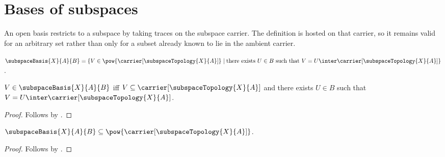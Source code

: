 \section{Bases of subspaces}




An open basis restricts to a subspace by taking traces on the subspace
carrier.  The definition is hosted on that carrier, so it remains valid for
an arbitrary set rather than only for a subset already known to lie in the
ambient carrier.

\begin{definition}\label{subspace_basis}
    $\subspaceBasis{X}{A}{B}
        =\{V\in\pow{\carrier[\subspaceTopology{X}{A}]}\mid
            \text{there exists $U\in B$ such that
                $V=U\inter\carrier[\subspaceTopology{X}{A}]$}\}$.
\end{definition}

\begin{proposition}\label{subspace_basis_iff}
    $V\in\subspaceBasis{X}{A}{B}$ iff
        $V\subseteq\carrier[\subspaceTopology{X}{A}]$ and
        there exists $U\in B$ such that
            $V=U\inter\carrier[\subspaceTopology{X}{A}]$.
\end{proposition}
\begin{proof}
    Follows by .
\end{proof}

\begin{proposition}\label{subspace_basis_type}
    $\subspaceBasis{X}{A}{B}
        \subseteq\pow{\carrier[\subspaceTopology{X}{A}]}$.
\end{proposition}
\begin{proof}
    Follows by .
\end{proof}

